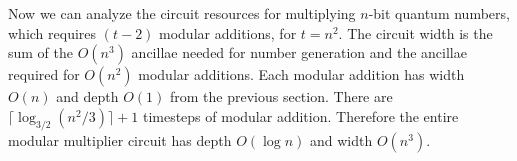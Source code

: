 Now we can analyze the circuit resources for multiplying $n$-bit
quantum numbers, which requires $(t-2)$ modular additions, for $t=n^2$.
The circuit width is the sum of the $O(n^3)$ ancillae
needed for number generation and the ancillae required for $O(n^2)$
modular additions. Each modular addition has width $O(n)$ and depth $O(1)$
from the previous
section. There are
$\lceil \log_{3/2}(n^2 / 3) \rceil +1 $ timesteps of modular addition. Therefore
the entire modular multiplier circuit has depth $O(\log n)$ and width $O(n^3)$.
